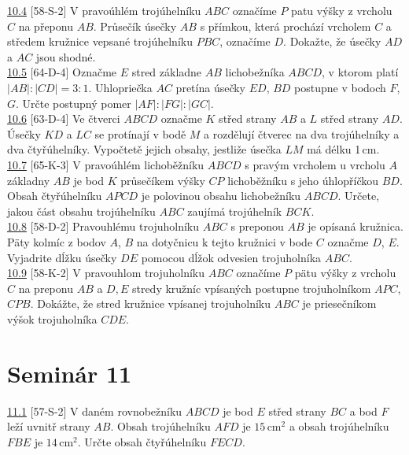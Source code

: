 \noindent \ul{10.4} [58-S-2] V pravoúhlém trojúhelníku $ABC$ označíme $P$ patu výšky z vrcholu $C$
 na přeponu $AB$. Průsečík úsečky $AB$ s přímkou, která prochází vrcholem $C$ a středem kružnice
 vepsané trojúhelníku $PBC$, označíme $D$. Dokažte, že úsečky $AD$ a $AC$ jsou shodné.\\

\noindent \ul{10.5} [64-D-4] Označme $E$ stred základne $AB$ lichobežníka $ABCD$, v ktorom platí $|AB| : |CD| = 3 : 1$. Uhlopriečka $AC$ pretína úsečky $ED$, $BD$ postupne v bodoch $F$, $G$. Určte postupný pomer $|AF| : |FG| : |GC|$.\\

\noindent \ul{10.6} [63-D-4] Ve čtverci $ABCD$ označme $K$ střed strany $AB$ a
$L$ střed strany $AD$. Úsečky $KD$ a $LC$ se protínají v bodě $M$ a rozdělují
čtverec na dva trojúhelníky a dva čtyřúhelníky. Vypočtetě jejich obsahy,
jestliže úsečka $LM$ má délku 1\,cm.\\

\noindent \ul{10.7} [65-K-3] V pravoúhlém lichoběžníku $ABCD$ s pravým vrcholem
u vrcholu $A$ základny $AB$ je bod $K$ průsečíkem výšky $CP$ lichoběžníku s
jeho úhlopříčkou $BD$. Obsah čtyřúhelníku $APCD$ je polovinou obsahu
lichobežníku $ABCD$. Určete, jakou část obsahu trojúhelníku $ABC$ zaujímá
trojúhelník $BCK$.\\

\noindent \ul{10.8} [58-D-2] Pravouhlému trojuholníku $ABC$ s preponou $AB$ je opísaná kružnica. Päty kolmíc z bodov $A$, $B$ na dotyčnicu k tejto kružnici v bode $C$ označme $D$, $E$. Vyjadrite dĺžku úsečky $DE$ pomocou dĺžok odvesien trojuholníka $ABC$.\\

\noindent \ul{10.9} [58-K-2]
V pravouhlom trojuholníku $ABC$ označíme $P$ pätu výšky z vrcholu $C$ na preponu $AB$ a $D, E$ stredy kružníc vpísaných postupne trojuholníkom $APC$, $CPB$. Dokážte, že stred
kružnice vpísanej trojuholníku $ABC$ je priesečníkom výšok trojuholníka $CDE$.\\

\section*{Seminár 11}

\noindent \ul{11.1} [57-S-2] V daném rovnobežníku $ABCD$ je bod $E$ střed strany $BC$ a bod $F$ leží
uvnitř strany $AB$. Obsah trojúhelníku $AFD$ je $15$\,cm$^2$ a obsah trojúhelníku $FBE$ je
$14$\,cm$^2$. Určte obsah čtyřúhelníku $FECD$. \\

